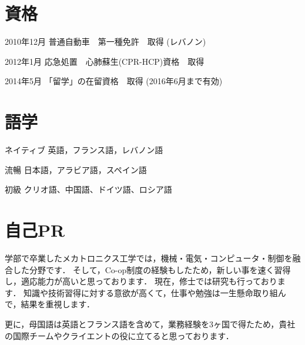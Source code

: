 \documentclass[10pt, a4paper]{article}
\begin{document}
\section{資格}
\begin{outerlist}
\item[2010年12月] 普通自動車　第一種免許　取得 (レバノン)
\item[2012年1月] 応急処置　心肺蘇生(CPR-HCP)資格　取得
\item[2014年5月] 「留学」の在留資格　取得 (2016年6月まで有効)
\end{outerlist}

\section{語学}
\begin{outerlist}
\item[ネイティブ] 英語，フランス語，レバノン語
\item[流暢] 日本語，アラビア語，スペイン語
\item[初級] クリオ語、中国語、ドイツ語、ロシア語
\end{outerlist}

\section{自己PR}
\begin{outerlist}
\item[] 学部で卒業したメカトロニクス工学では，機械・電気・コンピュータ・制御を融合した分野です．
  そして，Co-op制度の経験もしたため，新しい事を速く習得し，適応能力が高いと思っております．
  現在，修士では研究も行っております．
  知識や技術習得に対する意欲が高くて，仕事や勉強は一生懸命取り組んで，結果を重視します．

\item[] 更に，母国語は英語とフランス語を含めて，業務経験を3ヶ国で得たため，貴社の国際チームやクライエントの役に立てると思っております．
\end{outerlist}
\end{document}

